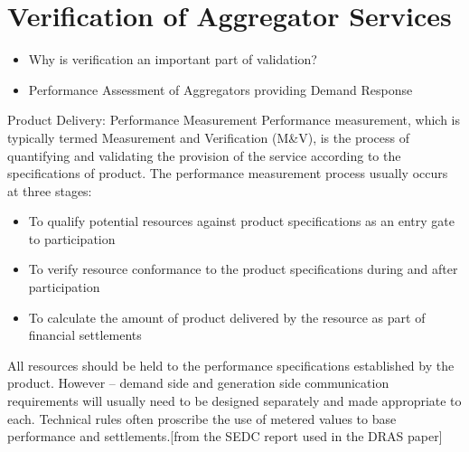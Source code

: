 \chapter{Verification of Aggregator Services} %
\label{cha:verification}

\begin{itemize}
	\item Why is verification an important part of validation?
	\item Performance Assessment of Aggregators providing Demand Response
\end{itemize}


Product Delivery: Performance Measurement 
Performance measurement, which is typically termed Measurement and Verification (M\&V), is the process of quantifying and validating the provision of the service according to the specifications of product. The performance measurement process usually occurs at three stages: 
\begin{itemize}
	\item To qualify potential resources against product specifications as an entry gate to participation 
	\item To verify resource conformance to the product specifications during and after participation 
	\item To calculate the amount of product delivered by the resource as part of financial settlements
\end{itemize}
 
All resources should be held to the performance specifications established by the product. However – demand side and generation side communication requirements will usually need to be designed separately and made appropriate to each. Technical rules often proscribe the use of metered values to base performance and settlements.[from the SEDC report used in the DRAS paper]



